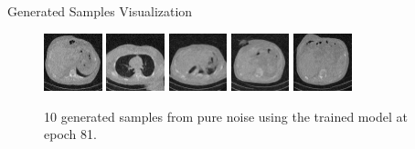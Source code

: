 \begin{frame}{Generated Samples Visualization}
\begin{figure}
        \includegraphics[width=0.15\textwidth]{media/epoch_81_5.png}\hspace{0.5em}
        \includegraphics[width=0.15\textwidth]{media/epoch_81_6.png}\hspace{0.5em}
        \includegraphics[width=0.15\textwidth]{media/epoch_81_7.png}\hspace{0.5em}
        \includegraphics[width=0.15\textwidth]{media/epoch_81_8.png}\hspace{0.5em}
        \includegraphics[width=0.15\textwidth]{media/epoch_81_9.png}

        \caption{10 generated samples from pure noise using the trained model at epoch 81.}
        \label{fig:generated_samples_from_pure_noise}
    \end{figure}
\end{frame}
